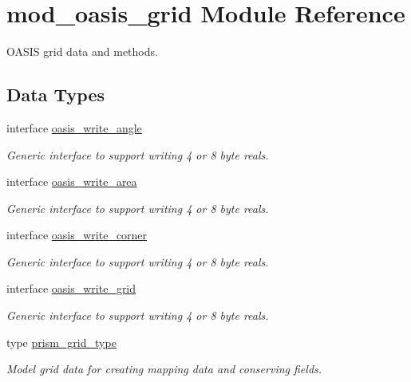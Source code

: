 \hypertarget{namespacemod__oasis__grid}{}\section{mod\+\_\+oasis\+\_\+grid Module Reference}
\label{namespacemod__oasis__grid}


O\+A\+S\+IS grid data and methods.  


\subsection*{Data Types}
\begin{DoxyCompactItemize}
\item 
interface \hyperlink{interfacemod__oasis__grid_1_1oasis__write__angle}{oasis\+\_\+write\+\_\+angle}
\begin{DoxyCompactList}\small\item\em Generic interface to support writing 4 or 8 byte reals. \end{DoxyCompactList}\item 
interface \hyperlink{interfacemod__oasis__grid_1_1oasis__write__area}{oasis\+\_\+write\+\_\+area}
\begin{DoxyCompactList}\small\item\em Generic interface to support writing 4 or 8 byte reals. \end{DoxyCompactList}\item 
interface \hyperlink{interfacemod__oasis__grid_1_1oasis__write__corner}{oasis\+\_\+write\+\_\+corner}
\begin{DoxyCompactList}\small\item\em Generic interface to support writing 4 or 8 byte reals. \end{DoxyCompactList}\item 
interface \hyperlink{interfacemod__oasis__grid_1_1oasis__write__grid}{oasis\+\_\+write\+\_\+grid}
\begin{DoxyCompactList}\small\item\em Generic interface to support writing 4 or 8 byte reals. \end{DoxyCompactList}\item 
type \hyperlink{structmod__oasis__grid_1_1prism__grid__type}{prism\+\_\+grid\+\_\+type}
\begin{DoxyCompactList}\small\item\em Model grid data for creating mapping data and conserving fields. \end{DoxyCompactList}\end{DoxyCompactItemize}
